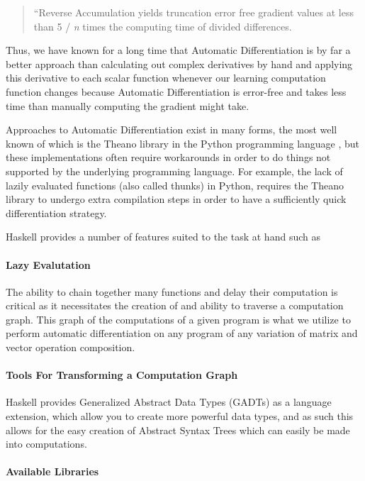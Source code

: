 \documentclass[prodmode,acmtecs]{acmsmall} %
\begin{document}
\begin{quote}
``Reverse Accumulation yields truncation error free gradient values at less than 5 / \emph{n} times the computing time of divided differences.
\end{quote}

Thus, we have known for a long time that Automatic Differentiation is by far a better
approach than calculating out complex derivatives by hand and applying this derivative to
each scalar function whenever our learning computation function changes because Automatic
Differentiation is error-free and takes less time than manually computing the gradient might
take.

Approaches to Automatic Differentiation exist in many forms, the most well known of which is
the Theano library in the Python programming language \cite{bastien2012}, but these
implementations often require workarounds in order to do things not supported by the
underlying programming language. For example, the lack of lazily evaluated functions (also
called thunks) in Python, requires the Theano library to undergo extra compilation steps
in order to have a sufficiently quick differentiation strategy.

Haskell provides a number of features suited to the task at hand such as

\paragraph{Lazy Evalutation}

The ability to chain together many functions and delay their computation is critical as it
necessitates the creation of and ability to traverse a computation graph. This graph of the
computations of a given program is what we utilize to perform automatic differentiation on
any program of any variation of matrix and vector operation composition.

\paragraph{Tools For Transforming a Computation Graph}

Haskell provides Generalized Abstract Data Types (GADTs) as a language extension, which
allow you to create more powerful data types, and as such this allows for the easy creation
of Abstract Syntax Trees which can easily be made into computations.

\paragraph{Available Libraries}
\end{document}
